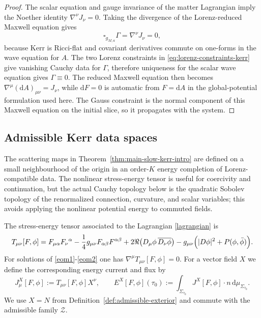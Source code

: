 \documentclass[11pt]{article}
\numberwithin{equation}{section}
\theoremstyle{plain}
\theoremstyle{definition}
\theoremstyle{remark}
\newcommand{\dd}{\mathrm{d}}
\begin{document}
\begin{proof}
The scalar equation and gauge invariance of the matter Lagrangian imply the Noether identity $\nabla^{\nu}J_{\nu}=0$. Taking the divergence of the Lorenz-reduced Maxwell equation gives
\begin{equation}
\square_{g_{M,a}}\Gamma=\nabla^{\nu}J_{\nu}=0,
\end{equation}
because Kerr is Ricci-flat and covariant derivatives commute on one-forms in the wave equation for $A$. The two Lorenz constraints in \eqref{eq:lorenz-constraints-kerr} give vanishing Cauchy data for $\Gamma$, therefore uniqueness for the scalar wave equation gives $\Gamma\equiv0$. The reduced Maxwell equation then becomes $\nabla^{\mu}(\dd A)_{\mu\nu}=J_{\nu}$, while $\dd F=0$ is automatic from $F=\dd A$ in the global-potential formulation used here. The Gauss constraint is the normal component of this Maxwell equation on the initial slice, so it propagates with the system.
\end{proof}

\subsection{Admissible Kerr data spaces}\label{subsec:kerr-data-space}

The scattering maps in Theorem~\ref{thm:main-slow-kerr-intro} are defined on a small neighbourhood of the origin in an order-$K$ energy completion of Lorenz-compatible data.
The nonlinear stress-energy tensor is useful for coercivity and continuation, but the actual Cauchy topology below is the quadratic Sobolev topology of the renormalized connection, curvature, and scalar variables; this avoids applying the nonlinear potential energy to commuted fields.


The stress-energy tensor associated to the Lagrangian \eqref{lagrangian} is
\begin{eqnarray}
T_{\mu\nu}[F,\phi]
=
F_{\mu\alpha}F_{\nu}{}^{\alpha}
-\frac14 g_{\mu\nu}F_{\alpha\beta}F^{\alpha\beta} 
+ 2\Re\!\left(D_\mu\phi\,\overline{D_\nu\phi}\right)
- g_{\mu\nu}\Bigl(|D\phi|^2+P(\phi,\bar\phi)\Bigr).
\label{eq:stress-energy-kerr}
\end{eqnarray}
For solutions of \eqref{eom1}-\eqref{eom2} one has $\nabla^\mu T_{\mu\nu}[F,\phi]=0$.
For a vector field $X$ we define the corresponding energy current and flux by
\begin{equation}
J^{X}_{\mu}[F,\phi]:=T_{\mu\nu}[F,\phi]X^\nu,
\qquad
E^{X}[F,\phi](\tau_{0}):=\int_{\Sigma_{\tau_{0}}} J^{X}[F,\phi]\cdot n\,\dd\mu_{\Sigma_{\tau_{0}}}.
\end{equation}
We use $X=N$ from Definition~\ref{def:admissible-exterior} and commute with the admissible family $\mathcal Z$.
\end{document}
